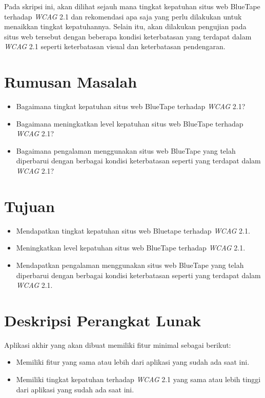 \documentclass[a4paper,twoside]{article}
\begin{document}
Pada skripsi ini, akan dilihat sejauh mana tingkat kepatuhan situs web BlueTape terhadap \textit{WCAG} 2.1 dan rekomendasi apa saja yang perlu dilakukan untuk menaikkan tingkat kepatuhannya. Selain itu, akan dilakukan pengujian pada situs web tersebut dengan beberapa kondisi keterbatasan yang terdapat dalam \textit{WCAG} 2.1 seperti keterbatasan visual dan keterbatasan pendengaran.

\section{Rumusan Masalah}
\begin{itemize}
	\item Bagaimana tingkat kepatuhan situs web BlueTape terhadap \textit{WCAG} 2.1?
	\item Bagaimana meningkatkan level kepatuhan situs web BlueTape terhadap \textit{WCAG} 2.1?  
	\item Bagaimana pengalaman menggunakan situs web BlueTape yang telah diperbarui dengan berbagai kondisi keterbatasan seperti yang terdapat dalam \textit{WCAG} 2.1?
\end{itemize}

\section{Tujuan}
\begin{itemize}
	\item Mendapatkan tingkat kepatuhan situs web Bluetape terhadap \textit{WCAG} 2.1.
	\item Meningkatkan level kepatuhan situs web BlueTape terhadap \textit{WCAG} 2.1.
	\item Mendapatkan pengalaman menggunakan situs web BlueTape yang telah diperbarui dengan berbagai kondisi keterbatasan seperti yang terdapat dalam \textit{WCAG} 2.1.
\end{itemize}

\section{Deskripsi Perangkat Lunak}
Aplikasi akhir yang akan dibuat memiliki fitur minimal sebagai berikut:
\begin{itemize}
	\item Memiliki fitur yang sama atau lebih dari aplikasi yang sudah ada saat ini.
	\item Memiliki tingkat kepatuhan terhadap \textit{WCAG} 2.1 yang sama atau lebih tinggi dari aplikasi yang sudah ada saat ini.
\end{itemize}
\end{document}
